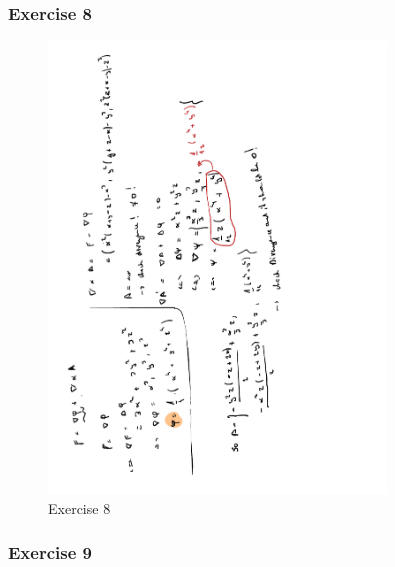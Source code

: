 \documentclass[a4paper]{report}
\begin{document}
\subsubsection{Exercise 8}

\begin{figure}[H]
	\centering
	\includegraphics[angle=-90, width=0.8\textwidth]{assets/huis_6_ex_8.pdf}
	\caption{Exercise 8}
	\label{fig:huis_6_ex_8}
\end{figure}

\subsubsection{Exercise 9}
\end{document}
